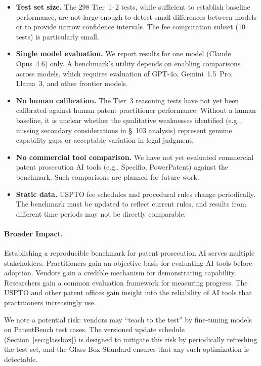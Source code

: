 \documentclass[11pt]{article}
\begin{document}
\begin{itemize}[leftmargin=*]
    \item \textbf{Test set size.} The 298 Tier~1--2 tests, while sufficient to establish baseline performance, are not large enough to detect small differences between models or to provide narrow confidence intervals. The fee computation subset (10 tests) is particularly small.

    \item \textbf{Single model evaluation.} We report results for one model (Claude Opus~4.6) only. A benchmark's utility depends on enabling comparisons across models, which requires evaluation of GPT-4o, Gemini~1.5~Pro, Llama~3, and other frontier models.

    \item \textbf{No human calibration.} The Tier~3 reasoning tests have not yet been calibrated against human patent practitioner performance. Without a human baseline, it is unclear whether the qualitative weaknesses identified (e.g., missing secondary considerations in \S~103 analysis) represent genuine capability gaps or acceptable variation in legal judgment.

    \item \textbf{No commercial tool comparison.} We have not yet evaluated commercial patent prosecution AI tools (e.g., Specifio, PowerPatent) against the benchmark. Such comparisons are planned for future work.

    \item \textbf{Static data.} USPTO fee schedules and procedural rules change periodically. The benchmark must be updated to reflect current rules, and results from different time periods may not be directly comparable.
\end{itemize}

\paragraph{Broader Impact.}
Establishing a reproducible benchmark for patent prosecution AI serves multiple stakeholders. Practitioners gain an objective basis for evaluating AI tools before adoption. Vendors gain a credible mechanism for demonstrating capability. Researchers gain a common evaluation framework for measuring progress. The USPTO and other patent offices gain insight into the reliability of AI tools that practitioners increasingly use.

We note a potential risk: vendors may ``teach to the test'' by fine-tuning models on PatentBench test cases. The versioned update schedule (Section~\ref{sec:glassbox}) is designed to mitigate this risk by periodically refreshing the test set, and the Glass Box Standard ensures that any such optimization is detectable.
\end{document}
